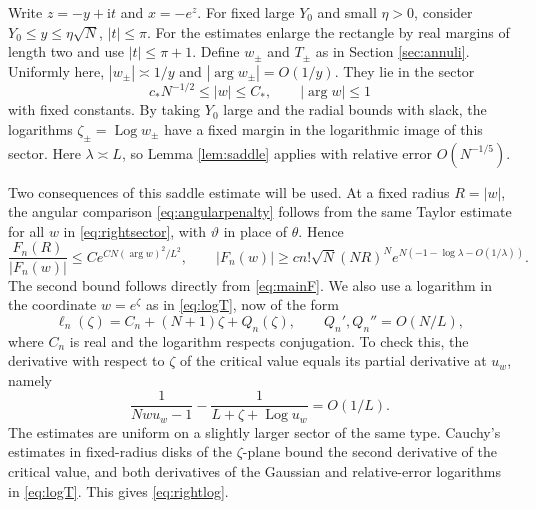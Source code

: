 \documentclass[11pt]{article}
\DeclareMathOperator{\Arg}{arg}
\newcommand{\ii}{\mathrm i}
\newcommand{\Log}{\operatorname{Log}}
\begin{document}
Write \(z=-y+\ii t\) and \(x=-e^z\). For fixed large \(Y_0\) and small \(\eta>0\), consider \(Y_0\le y\le\eta\sqrt N\), \(|t|\le\pi\). For the estimates enlarge the rectangle by real margins of length two and use \(|t|\le\pi+1\). Define \(w_\pm\) and \(T_\pm\) as in Section \ref{sec:annuli}. Uniformly here, \(|w_\pm|\asymp1/y\) and \(|\Arg w_\pm|=O(1/y)\). They lie in the sector
\begin{equation}\label{eq:rightsector}
 c_*N^{-1/2}\le |w|\le C_*,\qquad |\Arg w|\le1
\end{equation}
with fixed constants. By taking \(Y_0\) large and the radial bounds with slack, the logarithms \(\zeta_\pm=\Log w_\pm\) have a fixed margin in the logarithmic image of this sector. Here \(\lambda\asymp L\), so Lemma \ref{lem:saddle} applies with relative error \(O(N^{-1/5})\).

Two consequences of this saddle estimate will be used. At a fixed radius \(R=|w|\), the angular comparison \eqref{eq:angularpenalty} follows from the same Taylor estimate for all \(w\) in \eqref{eq:rightsector}, with \(\vartheta\) in place of \(\theta\). Hence
\begin{equation}\label{eq:rightcmp}
 \frac{F_n(R)}{|F_n(w)|}\le C e^{CN(\Arg w)^2/L^2},\qquad
 |F_n(w)|\ge c n!\sqrt N(NR)^N e^{N(-1-\log\lambda-O(1/\lambda))}.
\end{equation}
The second bound follows directly from \eqref{eq:mainF}. We also use a logarithm in the coordinate \(w=e^\zeta\) as in \eqref{eq:logT}, now of the form
\begin{equation}\label{eq:rightlog}
 \ell_n(\zeta)=C_n+(N+1)\zeta+Q_n(\zeta),
 \qquad Q_n',Q_n''=O(N/L),
\end{equation}
where \(C_n\) is real and the logarithm respects conjugation. To check this, the derivative with respect to \(\zeta\) of the critical value equals its partial derivative at \(u_w\), namely
\[
 \frac1{Nwu_w-1}-\frac1{L+\zeta+\Log u_w}=O(1/L).
\]
The estimates are uniform on a slightly larger sector of the same type. Cauchy's estimates in fixed-radius disks of the \(\zeta\)-plane bound the second derivative of the critical value, and both derivatives of the Gaussian and relative-error logarithms in \eqref{eq:logT}. This gives \eqref{eq:rightlog}.
\end{document}
